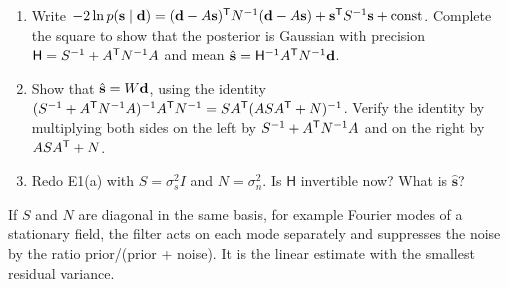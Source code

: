
\begin{enumerate}
  \item Write $-2\ln p(\mathbf s\mid\mathbf{d}) = (\mathbf{d} - A\mathbf s)^{\mathsf{T}} N^{-1}(\mathbf{d} - A\mathbf s) + \mathbf s^{\mathsf{T}} S^{-1}\mathbf s + \text{const}$.
    Complete the square to show that the posterior is Gaussian with precision
    $\mathsf H = S^{-1} + A^{\mathsf{T}} N^{-1}A$ and mean $\hat{\mathbf s} = \mathsf H^{-1}A^{\mathsf{T}} N^{-1}\mathbf{d}$.
  \item Show that $\hat{\mathbf s} = W\mathbf{d}$, using the identity
    $(S^{-1} + A^{\mathsf{T}} N^{-1}A)^{-1}A^{\mathsf{T}} N^{-1} = SA^{\mathsf{T}}(ASA^{\mathsf{T}} + N)^{-1}$. Verify the identity by multiplying both sides on
    the left by $S^{-1} + A^{\mathsf{T}} N^{-1}A$ and on the right by $ASA^{\mathsf{T}} + N$.
  \item Redo E1(a) with $S = \sigma_s^2 I$ and $N = \sigma_n^2$. Is $\mathsf H$ invertible now? What is $\hat{\mathbf s}$?
\end{enumerate}



\begin{given}
If $S$ and $N$ are diagonal in the same basis, for example Fourier modes of a stationary field, the filter acts on
each mode separately and suppresses the noise by the ratio prior/(prior + noise). It is the linear estimate with the
smallest residual variance.
\end{given}

